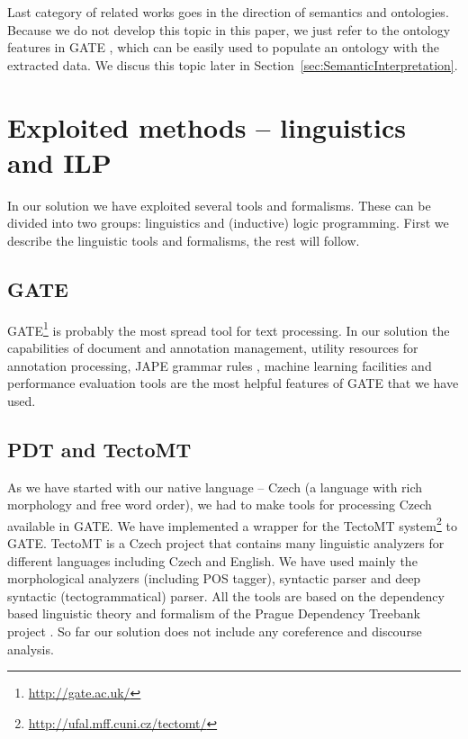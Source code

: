 \documentclass[runningheads,a4paper]{llncs}
\begin{document}
Last category of related works goes in the direction of semantics and ontologies. Because we do not develop this topic in this paper, we just refer to the ontology features in GATE \cite{Bon04b}, which can be easily used to populate an ontology with the extracted data. We discus this topic later in Section~\ref{sec:SemanticInterpretation}.




\section{Exploited methods -- linguistics and ILP}
In our solution we have exploited several tools and formalisms. These can be divided into two groups: linguistics and (inductive) logic programming. First we describe the linguistic tools and formalisms, the rest will follow.

\subsection{GATE}
GATE\footnote{\url{http://gate.ac.uk/}} \cite{dedek:GATE_course} is probably the most spread tool for text processing. In our solution the capabilities of document and annotation management, utility resources for annotation processing, JAPE grammar rules \cite{Cunningham00jape:a}, machine learning facilities and performance evaluation tools are the most helpful features of GATE that we have used.

\subsection{PDT and TectoMT}
As we have started with our native language -- Czech (a language with rich morphology and free word order), we had to make tools for processing Czech available in GATE. We have implemented a wrapper for the TectoMT system\footnote{\url{http://ufal.mff.cuni.cz/tectomt/}} \cite{dedek:ZaPtTectoMTHighly2008} to GATE. TectoMT is a Czech project that contains many linguistic analyzers for different languages including Czech and English. We have used mainly the morphological analyzers (including POS tagger), syntactic parser and deep syntactic (tectogrammatical) parser. All the tools are based on the dependency based linguistic theory and formalism of the Prague Dependency Treebank project \cite{dedek:PDT20_CD}. So far our solution does not include any coreference and discourse analysis.
\end{document}
